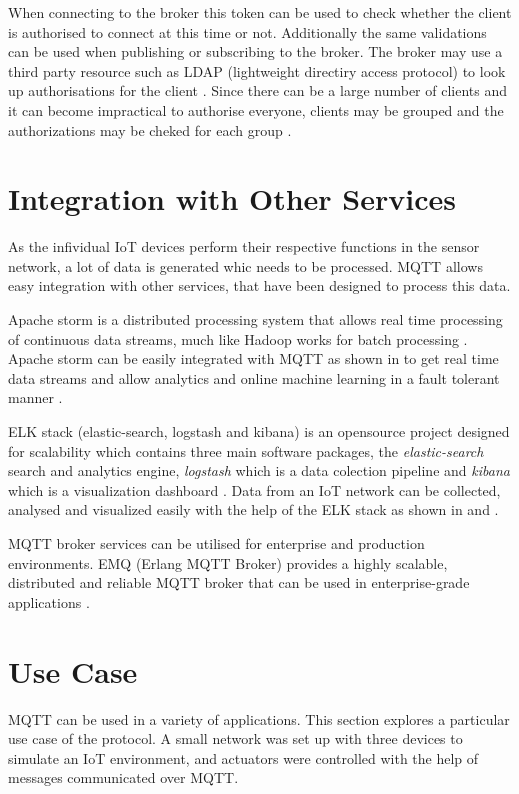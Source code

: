 \documentclass[sigconf]{acmart}
\begin{document}
When connecting to the broker this token can be used to check whether the client is authorised to connect at this time or not. Additionally the same validations can be used when publishing or subscribing to the broker. The broker may use a third party resource such as LDAP (lightweight directiry access protocol) to look up authorisations for the client \cite{hivemq-security-oauth}. Since there can be a large number of clients and it can become impractical to authorise everyone, clients may be grouped and the authorizations may be cheked for each group \cite{ibm-mqtt-security}.
  
\section{Integration with Other Services}
As the infividual IoT devices perform their respective functions in the sensor network, a lot of data is generated whic needs to be processed. MQTT allows easy integration with other services, that have been designed to process this data.

Apache storm is a distributed processing system that allows real time  processing of continuous data streams, much like Hadoop works for batch processing \cite{apache-storm}. Apache storm can be easily integrated with MQTT as shown in \cite{apache-storm-mqtt} to get real time data streams and allow analytics and online machine learning in a fault tolerant manner \citep{apache-storm-wiki}.

ELK stack (elastic-search, logstash and kibana) is an opensource project designed for scalability which contains three main software packages, the {\em elastic-search} search and analytics engine, {\em logstash} which is a data colection pipeline and {\em kibana} which is a visualization dashboard \cite{elk-stack}. Data from an IoT network can be collected, analysed and visualized easily with the help of the ELK stack as shown in \cite{mqtt-elasticsearch-setup} and \cite{kibana-mqtt-analysis}.

MQTT broker services can be utilised for enterprise and production environments. EMQ (Erlang MQTT Broker) provides a highly scalable, distributed and reliable MQTT broker that can be used in enterprise-grade applications \cite{erlang-mqtt-broker}. 


\section{Use Case}
MQTT can be used in a variety of applications. This section explores a particular use case of the protocol. A small network was set up with three devices to simulate an IoT environment, and actuators were controlled with the help of messages communicated over MQTT.
\end{document}
